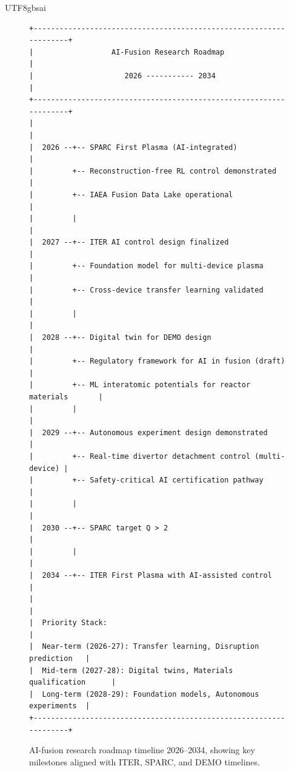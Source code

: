 \documentclass[12pt,a4paper]{article}
\begin{document}
\begin{CJK}{UTF8}{gbsai}
\begin{figure}[htbp]
\centering
\small
\begin{verbatim}
+-------------------------------------------------------------------+
|                  AI-Fusion Research Roadmap                        |
|                     2026 ----------- 2034                         |
+-------------------------------------------------------------------+
|                                                                   |
|  2026 --+-- SPARC First Plasma (AI-integrated)                   |
|         +-- Reconstruction-free RL control demonstrated           |
|         +-- IAEA Fusion Data Lake operational                     |
|         |                                                        |
|  2027 --+-- ITER AI control design finalized                     |
|         +-- Foundation model for multi-device plasma              |
|         +-- Cross-device transfer learning validated              |
|         |                                                        |
|  2028 --+-- Digital twin for DEMO design                         |
|         +-- Regulatory framework for AI in fusion (draft)         |
|         +-- ML interatomic potentials for reactor materials       |
|         |                                                        |
|  2029 --+-- Autonomous experiment design demonstrated            |
|         +-- Real-time divertor detachment control (multi-device) |
|         +-- Safety-critical AI certification pathway              |
|         |                                                        |
|  2030 --+-- SPARC target Q > 2                                    |
|         |                                                        |
|  2034 --+-- ITER First Plasma with AI-assisted control           |
|                                                                   |
|  Priority Stack:                                                  |
|  Near-term (2026-27): Transfer learning, Disruption prediction   |
|  Mid-term (2027-28): Digital twins, Materials qualification      |
|  Long-term (2028-29): Foundation models, Autonomous experiments  |
+-------------------------------------------------------------------+
\end{verbatim}
\caption{AI-fusion research roadmap timeline 2026--2034, showing key milestones aligned with ITER, SPARC, and DEMO timelines.}
\label{fig:roadmap-timeline}
\end{figure}


\end{CJK}
\end{document}
